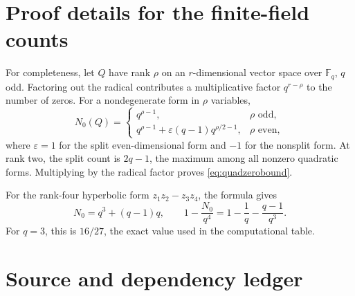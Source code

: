 \documentclass[11pt]{article}
\numberwithin{equation}{section}
\theoremstyle{definition}
\theoremstyle{remark}
\newcommand{\F}{\mathbb F}
\begin{document}
\section{Proof details for the finite-field counts}
\label{app:counts}

For completeness, let \(Q\) have rank \(\rho\) on an \(r\)-dimensional vector space over
\(\F_q\), \(q\) odd.  Factoring out the radical contributes a multiplicative factor
\(q^{r-\rho}\) to the number of zeros.  For a nondegenerate form in \(\rho\) variables,
\[
 N_0(Q)=
 \begin{cases}
 q^{\rho-1},&\rho\text{ odd},\\[0.3em]
 q^{\rho-1}+\varepsilon(q-1)q^{\rho/2-1},&\rho\text{ even},
 \end{cases}
\]
where \(\varepsilon=1\) for the split even-dimensional form and \(-1\) for the nonsplit
form.  At rank two, the split count is \(2q-1\), the maximum among all nonzero quadratic
forms.  Multiplying by the radical factor proves \eqref{eq:quadzerobound}.

For the rank-four hyperbolic form \(z_1z_2-z_3z_4\), the formula gives
\[
 N_0=q^3+(q-1)q,
 \qquad
 1-\frac{N_0}{q^4}=1-\frac1q-\frac{q-1}{q^3}.
\]
For \(q=3\), this is \(16/27\), the exact value used in the computational table.

\section{Source and dependency ledger}
\label{app:ledger}
\end{document}
